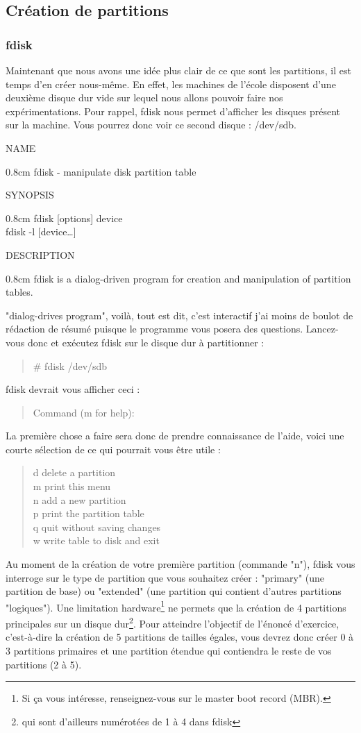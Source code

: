\documentclass[a4paper,11pt]{article}
\newcommand{\commande}[1] {
    \begin{quote}
    \tt\raggedright #1
    \end{quote}
}
\newcommand{\man}[2]{
    \begin{tcolorbox}[toprule=3mm,width=\textwidth,outer arc=0mm,colbacktitle=grayman,coltitle=black,colback={grayman},colframe={grayman},title={man : \tt #1}]
        \tt\raggedright #2
    \end{tcolorbox}
}
\newcommand{\mandesc}[1]{
    \begin{adjustwidth}{0.8cm}{}
        #1
    \end{adjustwidth}
}
\begin{document}
\subsection{Création de partitions}
\subsubsection{fdisk}
\par Maintenant que nous avons une idée plus clair de ce que sont les partitions, il est temps d'en créer nous-même. En effet, les machines de l'école disposent d'une deuxième disque dur vide sur lequel nous allons pouvoir faire nos expérimentations. Pour rappel, fdisk nous permet d'afficher les disques présent sur la machine. Vous pourrez donc voir ce second disque : /dev/sdb.
\man{fdisk}{NAME
\mandesc{fdisk - manipulate disk partition table}
SYNOPSIS
\mandesc{fdisk [options] device\\
fdisk -l [device\dots]}
DESCRIPTION
\mandesc{fdisk is a dialog-driven program for creation and manipulation of partition tables.}
}
\par "dialog-drives program", voilà, tout est dit, c'est interactif j'ai moins de boulot de rédaction de résumé puisque le programme vous posera des questions. Lancez-vous donc et exécutez fdisk sur le disque dur à partitionner :
\commande{\# fdisk /dev/sdb}
\par fdisk devrait vous afficher ceci :
\commande{Command (m for help):}
\par La première chose a faire sera donc de prendre connaissance de l'aide, voici une courte sélection de ce qui pourrait vous être utile :
\commande{d delete a partition\\
m print this menu\\
n add a new partition\\
p print the partition table\\
q quit without saving changes\\
w write table to disk and exit}
\par Au moment de la création de votre première partition (commande "n"), fdisk vous interroge sur le type de partition que vous souhaitez créer : "primary" (une partition de base) ou "extended" (une partition qui contient d'autres partitions "logiques"). Une limitation hardware\footnote{Si ça vous intéresse, renseignez-vous sur le master boot record (MBR).} ne permets que la création de 4 partitions principales sur un disque dur\footnote{qui sont d'ailleurs numérotées de 1 à 4 dans fdisk}. Pour atteindre l'objectif de l'énoncé d'exercice, c'est-à-dire la création de 5 partitions de tailles égales, vous devrez donc créer 0 à 3 partitions primaires et une partition étendue qui contiendra le reste de vos partitions (2 à 5).
\end{document}
